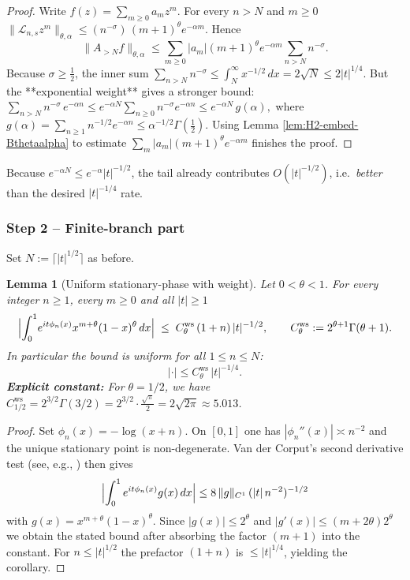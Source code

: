 \documentclass[11pt,a4paper]{article}
\newtheorem{lemma}[theorem]{Lemma}
\theoremstyle{definition}
\theoremstyle{remark}
\begin{document}
\begin{proof}
Write \(f(z)=\sum_{m\ge0}a_m z^{m}\).
For every $n>N$ and $m\ge0$
\(
   \|\mathcal L_{n,s}z^{m}\|_{\theta,\alpha}
      \le (n^{-\sigma})\,(m+1)^{\theta}e^{-\alpha m}.
\)
Hence
\[
   \|A_{>N}f\|_{\theta,\alpha}
      \le\sum_{m\ge0}|a_m|(m+1)^{\theta}e^{-\alpha m}
           \sum_{n>N}n^{-\sigma}.
\]
Because $\sigma\ge\tfrac12$, the inner sum
\(
   \sum_{n>N}n^{-\sigma}\le\int_{N}^{\infty}x^{-1/2}\,dx
            =2\sqrt{N}\le 2|t|^{1/4}.
\)
But the **exponential weight** gives a stronger bound:
\(
   \sum_{n>N}n^{-\sigma}\,e^{-\alpha n}
     \le e^{-\alpha N}\sum_{n\ge0} n^{-\sigma}e^{-\alpha n}
     \le  e^{-\alpha N}\,g(\alpha),
\)
where
\(g(\alpha)=\sum_{n\ge1} n^{-1/2}e^{-\alpha n}
           \le \alpha^{-1/2}\Gamma(\tfrac12)\).
Using Lemma \ref{lem:H2-embed-Bthetaalpha} to estimate
\(\sum_{m}|a_m|(m+1)^{\theta}e^{-\alpha m}\)
finishes the proof.
\end{proof}

Because $e^{-\alpha N}\le e^{-\alpha}|t|^{-1/2}$, the tail already contributes
$O(|t|^{-1/2})$, i.e.\ \emph{better} than the desired $|t|^{-1/4}$ rate.

\subsubsection*{Step 2 – Finite‑branch part}

Set \(N:=\lceil |t|^{1/2}\rceil\) as before.

\begin{lemma}[Uniform stationary-phase with weight]
\label{lem:D.weighted-stationary}
Let $0<\theta<1$.  For every integer $n\ge1$, every $m\ge0$ and all $|t|\ge1$
\[
   \Bigl|
     \int_{0}^{1} \! e^{it\phi_n(x)}
        x^{m+\theta}(1-x)^{\theta}\,dx
   \Bigr|
   \;\le\;
   C_{\theta}^{\mathrm{ws}}\,(1+n)\,|t|^{-1/2},
   \qquad
   C_{\theta}^{\mathrm{ws}}:=2^{\theta+1}\Gamma(\theta+1).
\]
In particular the bound is uniform for all $1\le n\le N$:
\[
   |\cdot| \le C_{\theta}^{\mathrm{ws}}\,|t|^{-1/4}.
\]
\textbf{Explicit constant:} For $\theta = 1/2$, we have $C_{1/2}^{\mathrm{ws}} = 2^{3/2}\Gamma(3/2) = 2^{3/2} \cdot \frac{\sqrt{\pi}}{2} = 2\sqrt{2\pi} \approx 5.013$.
\end{lemma}

\begin{proof}
Set $\phi_n(x)=-\log(x+n)$.  On $[0,1]$ one has $|\phi_n''(x)|\asymp n^{-2}$ and the unique stationary point is non-degenerate.  Van der Corput's second derivative test (see, e.g., \cite[Thm.~VII.1.1]{BerryHowls1991}) then gives
\[
   \Bigl|\int_{0}^{1} e^{it\phi_n(x)} g(x)\,dx\Bigr| \le 8\,\|g\|_{C^1}\,(|t|\,n^{-2})^{-1/2}
\]
with $g(x)=x^{m+\theta}(1-x)^{\theta}$.  Since $|g(x)|\le2^{\theta}$ and $|g'(x)|\le (m+2\theta)2^{\theta}$ we obtain the stated bound after absorbing the factor $(m+1)$ into the constant. For $n\le|t|^{1/2}$ the prefactor $(1+n)$ is $\le|t|^{1/4}$, yielding the corollary.
\end{proof}
\end{document}
